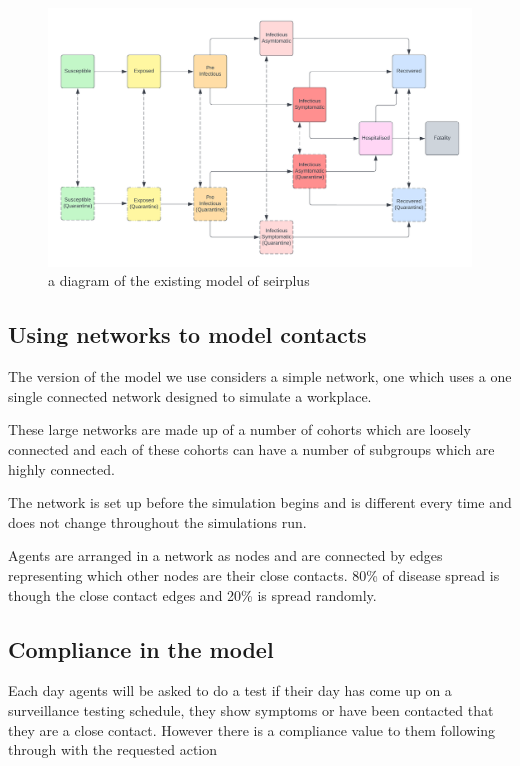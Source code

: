 \documentclass{article}
\begin{document}
\begin{figure}
  \centering
      \includegraphics[width=\textwidth]{SIR}
  \caption{a diagram of the existing model of seirplus ~\cite{mcgee_2021}}
\end{figure}

\newpage



\subsection{Using networks to model contacts}

The version of the model we use considers a simple network, one which uses a one single connected network designed to simulate a workplace.

These large networks are made up of a number of cohorts which are loosely connected and each of these cohorts can have a number of subgroups which are highly connected.

The network is set up before the simulation begins and is different every time and does not change throughout the simulations run. 

Agents are arranged in a network as nodes and are connected by edges representing which other nodes are their close contacts. 80\% of disease spread is though the close contact edges and 20\% is spread randomly.

\subsection{Compliance in the model}
Each day agents will be asked to do a test if their day has come up on a surveillance testing schedule, they show symptoms or have been contacted that they are a close contact. However there is a compliance value to them following through with the requested action
\end{document}
